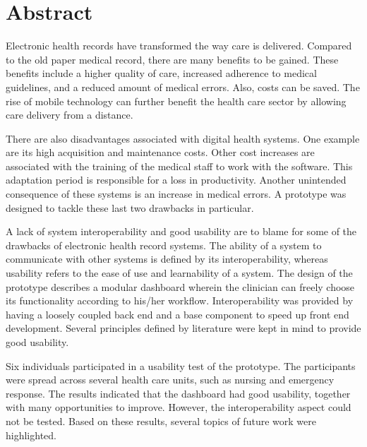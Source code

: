 \section*{Abstract}

Electronic health records have transformed the way care is delivered. Compared to the old paper medical record, there are many benefits to be gained. These benefits include a higher quality of care, increased adherence to medical guidelines, and a reduced amount of medical errors. Also, costs can be saved. The rise of mobile technology can further benefit the health care sector by allowing care delivery from a distance.

There are also disadvantages associated with digital health systems. One example are its high acquisition and maintenance costs. Other cost increases are associated with the training of the medical staff to work with the software. This adaptation period is responsible for a loss in productivity. Another unintended consequence of these systems is an increase in medical errors. A prototype was designed to tackle these last two drawbacks in particular.

A lack of system interoperability and good usability are to blame for some of the drawbacks of electronic health record systems. The ability of a system to communicate with other systems is defined by its interoperability, whereas usability refers to the ease of use and learnability of a system. The design of the prototype describes a modular dashboard wherein the clinician can freely choose its functionality according to his/her workflow. Interoperability was provided by having a loosely coupled back end and a base component to speed up front end development. Several principles defined by literature were kept in mind to provide good usability.

Six individuals participated in a usability test of the prototype. The participants were spread across several health care units, such as nursing and emergency response. The results indicated that the dashboard had good usability, together with many opportunities to improve. However, the interoperability aspect could not be tested. Based on these results, several topics of future work were highlighted.